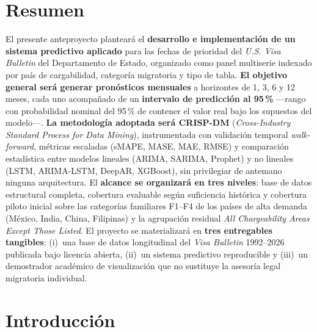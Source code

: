 \documentclass[12pt,letterpaper]{report}
\begin{document}
\clearpage

\chapter*{Resumen}

El presente anteproyecto planteará el \textbf{desarrollo e implementación de un sistema predictivo aplicado} para las fechas de prioridad del \textit{U.S. Visa Bulletin} del Departamento de Estado, organizado como panel multiserie indexado por país de cargabilidad, categoría migratoria y tipo de tabla. \textbf{El objetivo general será generar pronósticos mensuales} a horizontes de 1, 3, 6 y 12 meses, cada uno acompañado de un \textbf{intervalo de predicción al 95\,\%} ---rango con probabilidad nominal del 95\,\% de contener el valor real bajo los supuestos del modelo---. \textbf{La metodología adoptada será CRISP-DM} (\textit{Cross-Industry Standard Process for Data Mining}), instrumentada con validación temporal \textit{walk-forward}, métricas escaladas (sMAPE, MASE, MAE, RMSE) y comparación estadística entre modelos lineales (ARIMA, SARIMA, Prophet) y no lineales (LSTM, ARIMA-LSTM, DeepAR, XGBoost), sin privilegiar de antemano ninguna arquitectura. El \textbf{alcance se organizará en tres niveles}: base de datos estructural completa, cobertura evaluable según suficiencia histórica y cobertura piloto inicial sobre las categorías familiares F1--F4 de los países de alta demanda (México, India, China, Filipinas) y la agrupación residual \textit{All Chargeability Areas Except Those Listed}. El proyecto se materializará en \textbf{tres entregables tangibles}: (i)~una base de datos longitudinal del \textit{Visa Bulletin} 1992--2026 publicada bajo licencia abierta, (ii)~un sistema predictivo reproducible y (iii)~un demostrador académico de visualización que no sustituye la asesoría legal migratoria individual.

\clearpage


\chapter{Introducción}
\end{document}
